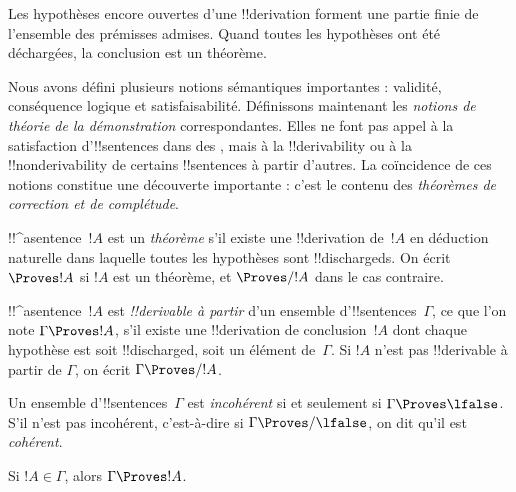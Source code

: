 \documentclass[../../../include/open-logic-section]{subfiles}
\begin{document}
      {}
      {}


Les hypothèses encore ouvertes d'une !!{derivation} forment
une partie finie de l'ensemble des prémisses admises.
Quand toutes les hypothèses ont été déchargées,
la conclusion est un théorème.

\begin{explain}
Nous avons défini plusieurs notions sémantiques importantes :
validité, conséquence logique et satisfaisabilité. Définissons
maintenant les \emph{notions de théorie de la démonstration}
correspondantes. Elles ne font pas appel à la satisfaction
d'!!{sentence}s dans des ,
mais à la !!{derivability} ou à la !!{nonderivability} de certains
!!{sentence}s à partir d'autres. La coïncidence de ces notions
constitue une découverte importante : c'est le contenu des
\emph{théorèmes de correction et de complétude}.
\end{explain}

\begin{defn}[Théorèmes]
!!^a{sentence}~$!A$ est un \emph{théorème} s'il existe une
!!{derivation} de~$!A$ en déduction naturelle dans laquelle toutes
les hypothèses sont !!{discharged}s. On écrit $\Proves !A$ si
$!A$ est un théorème, et $\Proves/ !A$ dans le cas contraire.
\end{defn}

\begin{defn}[!!^{derivability}]
!!^a{sentence}~$!A$ est \emph{!!{derivable} à partir} d'un ensemble
d'!!{sentence}s~$\Gamma$, ce que l'on note $\Gamma \Proves !A$,
s'il existe une !!{derivation} de conclusion~$!A$ dont chaque
hypothèse est soit !!{discharged}, soit un élément de~$\Gamma$.
Si $!A$ n'est pas !!{derivable} à partir de $\Gamma$, on écrit
$\Gamma \Proves/ !A$.
\end{defn}

\begin{defn}[Cohérence]
Un ensemble d'!!{sentence}s~$\Gamma$ est \emph{incohérent} si et
seulement si $\Gamma \Proves \lfalse$. S'il n'est pas incohérent,
c'est-à-dire si $\Gamma \Proves/ \lfalse$, on dit qu'il est
\emph{cohérent}.
\end{defn}

\begin{prop}[Réflexivité]
Si $!A \in \Gamma$, alors $\Gamma \Proves !A$.
\end{prop}
\end{document}
